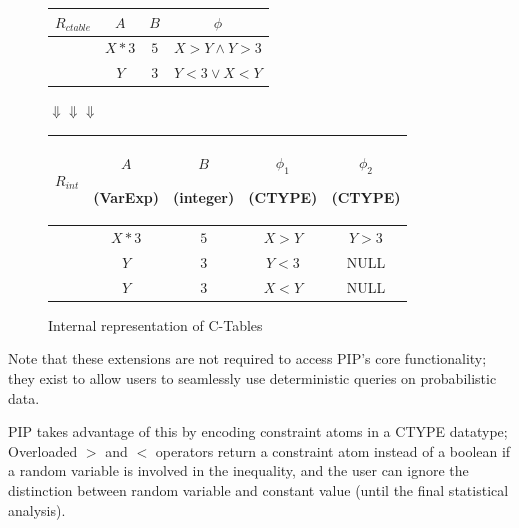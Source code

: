 \begin{figure}
\begin{center}
\footnotesize
\begin{tabular}{c|ccc}
$R_{ctable}$ & $A$ & $B$ & $\phi$ \\ \hline
& $X*3$ & $5$ & $X > Y \wedge Y > 3$ \\
& $Y$ & $3$ & $Y < 3 \vee X < Y$ \\
\end{tabular}
\begin{center}
$\Downarrow \Downarrow \Downarrow$
\end{center}
\begin{tabular}{c|cccc}
$R_{int}$ & $A$ \begin{footnotesize}(VarExp)\end{footnotesize} & $B$ \begin{footnotesize}(integer)\end{footnotesize} & $\phi_1$ \begin{footnotesize}(CTYPE)\end{footnotesize}& $\phi_2$  \begin{footnotesize}(CTYPE)\end{footnotesize} \\ \hline
& $X*3$ & $5$ & $X > Y$ & $Y > 3$ \\
& $Y$ & $3$ & $Y < 3$ & NULL \\
& $Y$ & $3$ & $X < Y$ & NULL \\
\end{tabular}
\caption{Internal representation of C-Tables}
\label{fig:intrep}
\end{center}
\vspace*{-0.3in}
\end{figure}



Note that these extensions are not required to access PIP's core functionality; they exist to allow users to seamlessly use deterministic queries on probabilistic data.

PIP takes advantage of this by encoding constraint atoms in a CTYPE datatype; Overloaded $>$ and $<$ operators return a constraint atom instead of a boolean if a random variable is involved in the inequality, and the user can ignore the distinction between random variable and constant value (until the final statistical analysis).


